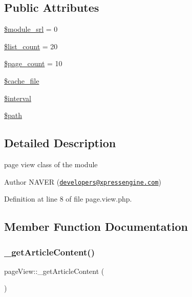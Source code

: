 \subsection*{Public Attributes}
\begin{DoxyCompactItemize}
\item 
\hyperlink{classpageView_add2f52835c01c951adb6b79453417cdf}{\$module\+\_\+srl} = 0
\item 
\hyperlink{classpageView_a7010bb0d08c9f9f9dc5a44aeaaa2bb15}{\$list\+\_\+count} = 20
\item 
\hyperlink{classpageView_a2f62b83f9128e0ccbec4a02dbb46962a}{\$page\+\_\+count} = 10
\item 
\hyperlink{classpageView_a3f961a1a2da08b16358c7541f1ba8363}{\$cache\+\_\+file}
\item 
\hyperlink{classpageView_afa343ab56bdad4ab563f9b7a6d69b95e}{\$interval}
\item 
\hyperlink{classpageView_ac629942e1cd4eacbca09412968f4c8e3}{\$path}
\end{DoxyCompactItemize}


\subsection{Detailed Description}
page view class of the module 

\begin{DoxyAuthor}{Author}
N\+A\+V\+ER (\href{mailto:developers@xpressengine.com}{\tt developers@xpressengine.\+com}) 
\end{DoxyAuthor}


Definition at line 8 of file page.\+view.\+php.



\subsection{Member Function Documentation}
\mbox{\label{classpageView_a8f6d1347a1991eec2ae2b964f5fec274}} 
\subsubsection{\texorpdfstring{\+\_\+get\+Article\+Content()}{\_getArticleContent()}}
{\footnotesize\ttfamily page\+View\+::\+\_\+get\+Article\+Content (\begin{DoxyParamCaption}{ }\end{DoxyParamCaption})}



